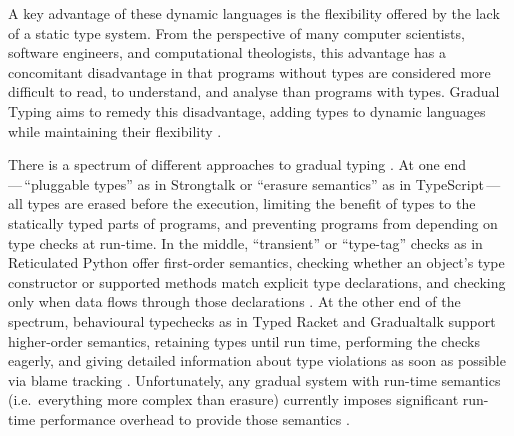 
A key advantage of these dynamic languages is the flexibility offered
by the lack of a static type system. 
From the perspective of many computer scientists, software engineers,
and computational theologists, this advantage has a concomitant
disadvantage in that programs without types are considered more
difficult to read, to understand, and analyse than programs with
types. Gradual Typing aims to remedy this disadvantage, adding types
to dynamic languages while maintaining their flexibility
\citep{GiladPluggable2004,Siek2006,XXXSiek2015}. 

There is a spectrum of different approaches to gradual typing
\cite{kafka18,bensurvey18icfp}.
At one end\,---\,``pluggable types'' as in Strongtalk \cite{strongtalk} or ``erasure
semantics'' as in 
TypeScript\citep{typeScriptECOOP}\,---\,
%
all types are erased before the execution, limiting the benefit of
types to the statically typed parts of programs, and preventing
programs from depending on type checks at run-time.  In the middle,
``transient'' or ``type-tag'' checks as in Reticulated Python 
offer first-order semantics, checking
whether an object's type constructor or supported methods match
explicit type declarations, and checking only when data flows through
those declarations \cite{Siek2007,Bloom2009,concrete15,reticPython2014,Greenman2018}.  At the other end of the spectrum, behavioural
typechecks as in Typed Racket \cite{typedScheme08,takikawa2012} and Gradualtalk \cite{gradualtalk14} support higher-order semantics, retaining
types until run 
time, performing the checks eagerly, and giving detailed information
about type violations as soon as possible via blame
tracking \cite{blame2009,blameForAll2011}.
%
%
Unfortunately, any gradual system with run-time semantics
(i.e.\ everything more complex than erasure) currently
imposes significant run-time performance overhead to provide those semantics
\citep{Takikawa2016,Vitousek2017,Muehlboeck2017,Bauman2017,Richards2017,Stulova2016,Greenman2018}.

